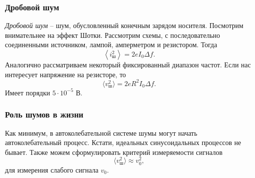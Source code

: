 \subsubsection*{Дробовой шум}

\textit{Дробовой шум} -- шум, обусловленный конечным зарядом носителя. Посмотрим внимательнее на эффект Шотки. Рассмотрим схемы, с последовательно соединенными источником, лампой, амперметром и резистором. Тогда
\begin{equation*}
    \left\langle i^2_{\text{ш}}\right\rangle = 2 e I_0 \Delta f. 
\end{equation*}
Аналогично рассматриваем некоторый фиксированный диапазон частот. Если нас интересует напряжение на резисторе, то
\begin{equation*}
    \langle v_{\text{ш}}^2\rangle = 2 e R^2 I_0 \Delta f.
\end{equation*}
Имеет порядки $5 \cdot 10^{-5}$ В. 



\subsubsection*{Роль шумов в жизни}

Как минимум, в автоколебательной системе шумы могут начать автоколебательный процесс. Кстати, идеальных синусоидальных процессов не бывает.  Также можем сформулировать критерий измеряемости сигналов
\begin{equation}
    \langle v_{\text{ш}}^2\rangle \approx v^2_0,
\end{equation}
для измерения слабого сигнала $v_0$. 







